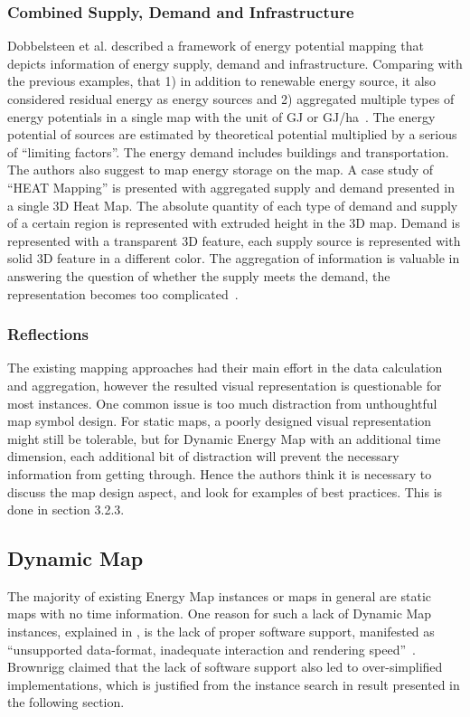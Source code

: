 \documentclass[hidelinks,12pt]{article}
\begin{document}
\subsubsection{Combined Supply, Demand and Infrastructure}
Dobbelsteen et al. described a framework of energy potential mapping
that depicts information of energy supply, demand and infrastructure.
Comparing with the previous examples, that 1) in addition to renewable
energy source, it also considered residual energy as energy sources
and 2) aggregated multiple types of energy potentials in a single map
with the unit of GJ or GJ/ha~\cite{Dobbelsteen2013}. The energy
potential of sources are estimated by theoretical potential multiplied
by a serious of ``limiting factors''. The energy demand includes
buildings and transportation. The authors also suggest to map energy
storage on the map. A case study of ``HEAT Mapping'' is presented with
aggregated supply and demand presented in a single 3D Heat Map. The
absolute quantity of each type of demand and supply of a certain
region is represented with extruded height in the 3D map. Demand is
represented with a transparent 3D feature, each supply source is
represented with solid 3D feature in a different color. The
aggregation of information is valuable in answering the question of
whether the supply meets the demand, the representation becomes too
complicated~\cite{Dobbelsteen2013}.

\subsubsection{Reflections}\label{Reflection}
The existing mapping approaches had their main effort in the data
calculation and aggregation, however the resulted visual
representation is questionable for most instances. One common issue is
too much distraction from unthoughtful map symbol design. For
static maps, a poorly designed visual representation might still be
tolerable, but for Dynamic Energy Map with an additional time
dimension, each additional bit of distraction will prevent the
necessary information from getting through. Hence the authors think it
is necessary to discuss the map design aspect, and look for examples
of best practices. This is done in section 3.2.3.

\subsection{Dynamic Map}\label{dynamicMap}
The majority of existing Energy Map instances or maps in general are
static maps with no time information. One reason for such a lack of
Dynamic Map instances, explained in \cite{Brownrigg2005}, is the lack
of proper software support, manifested as ``unsupported data-format,
inadequate interaction and rendering speed''~\cite{Brownrigg2005,
  Kwan2005}. Brownrigg claimed that the lack of software support
also led to over-simplified implementations, which is justified from
the instance search in result presented in the following section.
\end{document}
